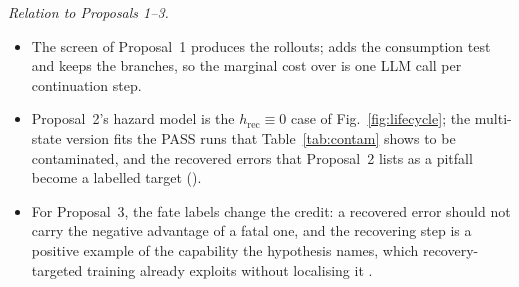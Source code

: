 \emph{Relation to Proposals 1--3.}
\begin{itemize}[leftmargin=1.1em]
\item The screen of Proposal~1 produces the rollouts;  adds the consumption test and keeps the branches, so the marginal cost over  is one LLM call per continuation step.
\item Proposal~2's hazard model is the $h_{\mathrm{rec}}\equiv0$ case of Fig.~\ref{fig:lifecycle}; the multi-state version fits the PASS runs that Table~\ref{tab:contam} shows to be contaminated, and the recovered errors that Proposal~2 lists as a pitfall become a labelled target ().
\item For Proposal~3, the fate labels change the credit: a recovered error should not carry the negative advantage of a fatal one, and the recovering step is a positive example of the capability the hypothesis names, which recovery-targeted training already exploits without localising it \cite{cuarecovery2026,reterm2026}.
\end{itemize}

